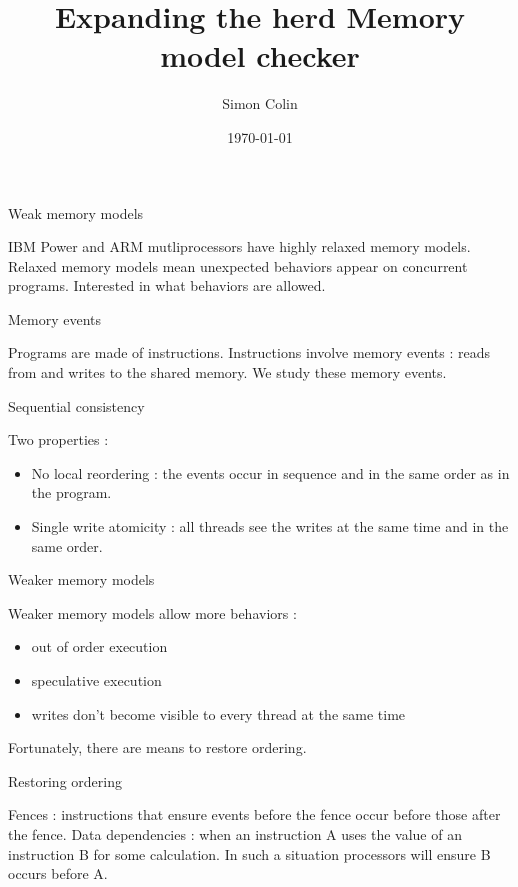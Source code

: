 \documentclass[dvipsnames,svgnames,beamer, 14pt]{beamer}
\title{Expanding the herd Memory model checker}
\author{Simon Colin}
\date{\today}
\begin{document}
\begin{frame}
	\titlepage
\end{frame}

\begin{frame}{Weak memory models}

	IBM Power and ARM mutliprocessors have highly relaxed memory models.
	\vfill
	Relaxed memory models mean unexpected behaviors appear on concurrent programs.
	\vfill
	Interested in what behaviors are allowed.
	
\end{frame}

\begin{frame}{Memory events}

	Programs are made of instructions.
	\vfill %
	Instructions involve memory events : reads from and writes to the shared memory.
	\vfill
	We study these memory events.

\end{frame}

\begin{frame}{Sequential consistency}

	Two properties :
	\begin{itemize}
	\item No local reordering : the events occur in sequence and in the same order as in the program.
	\item Single write atomicity : all threads see the writes at the same time and in the same order.
	\end{itemize}

\end{frame}

\begin{frame}{Weaker memory models}

	\vfill
	\vfill
	Weaker memory models allow more behaviors :\begin{itemize}
	\item out of order execution
	\item speculative execution
	\item writes don't become visible to every thread at the same time
	\end{itemize}
	\vfill
	Fortunately, there are means to restore ordering.
	\vfill

\end{frame}

\begin{frame}{Restoring ordering}

	Fences : instructions that ensure events before the fence occur before those after the fence.
	\vfill
	Data dependencies : when an instruction A uses the value of an instruction B for some calculation.
	\vfill
	In such a situation processors will ensure B occurs before A.

\end{frame}
\end{document}
